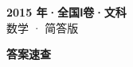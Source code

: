 \documentclass[zihao=-4, a4paper]{ctexart}
\begin{document}
\begin{center}
  {\Large\bfseries 2015 年·全国Ⅰ卷·文科}\\[4pt]
  {\large 数学 · 简答版}
\end{center}
\medskip
{}

\clearpage
{}
\begin{center}{\Large\bfseries 答案速查}\end{center}
\medskip

\end{document}
